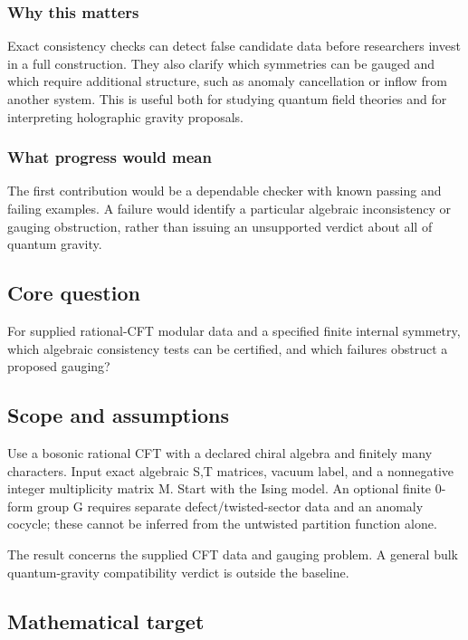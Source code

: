\documentclass[
  11pt,
]{article}
\begin{document}
\subsubsection{Why this matters}

Exact consistency checks can detect false candidate data before
researchers invest in a full construction. They also clarify which
symmetries can be gauged and which require additional structure, such as
anomaly cancellation or inflow from another system. This is useful both
for studying quantum field theories and for interpreting holographic
gravity proposals.

\subsubsection{What progress would mean}

The first contribution would be a dependable checker with known passing
and failing examples. A failure would identify a particular algebraic
inconsistency or gauging obstruction, rather than issuing an unsupported
verdict about all of quantum gravity.

\subsection{Core question}

For supplied rational-CFT modular data and a specified finite internal
symmetry, which algebraic consistency tests can be certified, and which
failures obstruct a proposed gauging?

\subsection{Scope and assumptions}

Use a bosonic rational CFT with a declared chiral algebra and finitely
many characters. Input exact algebraic S,T matrices, vacuum label, and a
nonnegative integer multiplicity matrix M. Start with the Ising model.
An optional finite 0-form group G requires separate
defect/twisted-sector data and an anomaly cocycle; these cannot be
inferred from the untwisted partition function alone.

The result concerns the supplied CFT data and gauging problem. A general
bulk quantum-gravity compatibility verdict is outside the baseline.

\subsection{Mathematical target}
\end{document}
